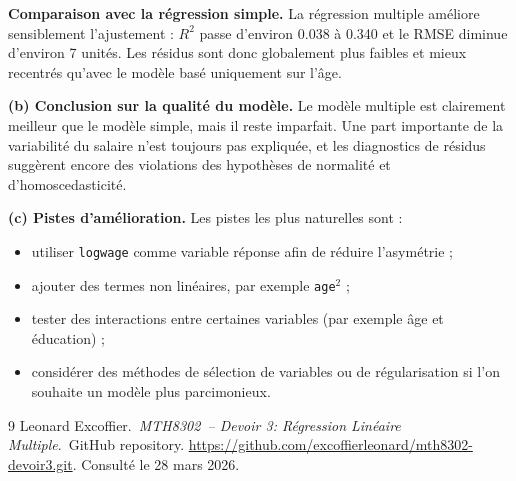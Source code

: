 \documentclass[12pt,letterpaper]{article}
\begin{document}
\textbf{Comparaison avec la régression simple.}
La régression multiple améliore sensiblement l'ajustement : $R^2$ passe d'environ 0.038 à 0.340 et le RMSE diminue d'environ 7 unités.
Les résidus sont donc globalement plus faibles et mieux recentrés qu'avec le modèle basé uniquement sur l'âge.

\textbf{(b) Conclusion sur la qualité du modèle.}
Le modèle multiple est clairement meilleur que le modèle simple, mais il reste imparfait.
Une part importante de la variabilité du salaire n'est toujours pas expliquée, et les diagnostics de résidus suggèrent encore des violations des hypothèses de normalité et d'homoscedasticité.

\textbf{(c) Pistes d'amélioration.}
Les pistes les plus naturelles sont :
\begin{itemize}
    \item utiliser \texttt{logwage} comme variable réponse afin de réduire l'asymétrie ;
    \item ajouter des termes non linéaires, par exemple \texttt{age}$^2$ ;
    \item tester des interactions entre certaines variables (par exemple âge et éducation) ;
    \item considérer des méthodes de sélection de variables ou de régularisation si l'on souhaite un modèle plus parcimonieux.
\end{itemize}

\begin{thebibliography}{9}
Leonard Excoffier.~\emph{MTH8302~-- Devoir 3: Régression Linéaire Multiple}.\ GitHub repository.
\url{https://github.com/excoffierleonard/mth8302-devoir3.git}. Consulté le 28 mars 2026.
\end{thebibliography}
\end{document}
